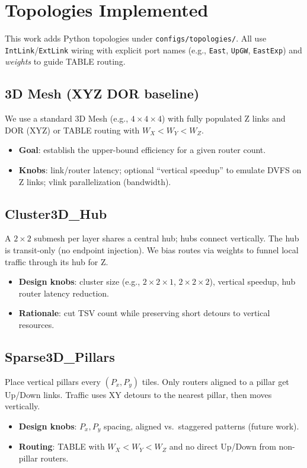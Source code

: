 \documentclass[11pt]{article}
\begin{document}
\section{Topologies Implemented}
This work adds Python topologies under \texttt{configs/topologies/}. All use \texttt{IntLink}/\texttt{ExtLink} wiring with explicit port names (e.g., \texttt{East}, \texttt{UpGW}, \texttt{EastExp}) and \emph{weights} to guide TABLE routing.

\subsection{3D Mesh (XYZ DOR baseline)}
\label{sec:mesh3d}
We use a standard 3D Mesh (e.g., $4{\times}4{\times}4$) with fully populated Z links and DOR (XYZ) or TABLE routing with $W_X < W_Y < W_Z$.
\begin{itemize}[leftmargin=1em]
  \item \textbf{Goal}: establish the upper-bound efficiency for a given router count.
  \item \textbf{Knobs}: link/router latency; optional ``vertical speedup'' to emulate DVFS on Z links; vlink parallelization (bandwidth).
\end{itemize}

\subsection{Cluster3D\_Hub}
A $2{\times}2$ submesh per layer shares a central hub; hubs connect vertically. The hub is transit-only (no endpoint injection). We bias routes via weights to funnel local traffic through its hub for Z.
\begin{itemize}[leftmargin=1em]
  \item \textbf{Design knobs}: cluster size (e.g., $2{\times}2{\times}1$, $2{\times}2{\times}2$), vertical speedup, hub router latency reduction.
  \item \textbf{Rationale}: cut TSV count while preserving short detours to vertical resources.
\end{itemize}

\subsection{Sparse3D\_Pillars}
Place vertical pillars every $(P_x, P_y)$ tiles. Only routers aligned to a pillar get Up/Down links. Traffic uses XY detours to the nearest pillar, then moves vertically.
\begin{itemize}[leftmargin=1em]
  \item \textbf{Design knobs}: $P_x,P_y$ spacing, aligned vs.\ staggered patterns (future work).
  \item \textbf{Routing}: TABLE with $W_X<W_Y<W_Z$ and no direct Up/Down from non-pillar routers.
\end{itemize}
\end{document}
